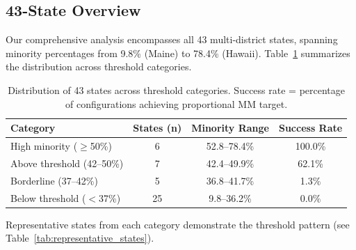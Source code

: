 \subsection{43-State Overview}

Our comprehensive analysis encompasses all 43 multi-district states, spanning minority percentages from 9.8\% (Maine) to 78.4\% (Hawaii). Table~\ref{tab:demographics_summary} summarizes the distribution across threshold categories.

\begin{table}[h]
\centering
\begin{tabular}{lccc}
\toprule
\textbf{Category} & \textbf{States (n)} & \textbf{Minority Range} & \textbf{Success Rate} \\
\midrule
High minority ($\geq$50\%)    & 6  & 52.8--78.4\% & 100.0\% \\
Above threshold (42--50\%)    & 7  & 42.4--49.9\% & 62.1\%  \\
Borderline (37--42\%)         & 5  & 36.8--41.7\% & 1.3\%   \\
Below threshold ($<$37\%)     & 25 & 9.8--36.2\%  & 0.0\%   \\
\bottomrule
\end{tabular}
\caption{Distribution of 43 states across threshold categories. Success rate = percentage of configurations achieving proportional MM target.}
\label{tab:demographics_summary}
\end{table}

Representative states from each category demonstrate the threshold pattern (see Table~\ref{tab:representative_states}).


